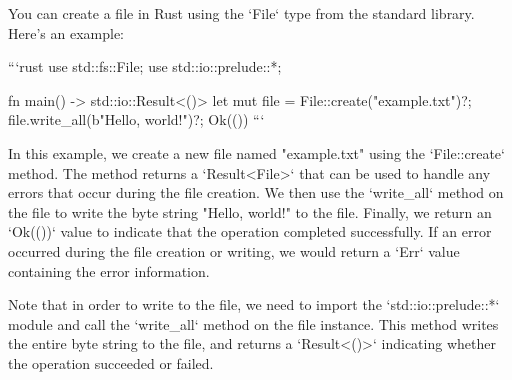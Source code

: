 You can create a file in Rust using the `File` type from the standard library. Here's an example:

```rust
use std::fs::File;
use std::io::prelude::*;

fn main() -> std::io::Result<()> {
    let mut file = File::create("example.txt")?;
    file.write_all(b"Hello, world!")?;
    Ok(())
}
```

In this example, we create a new file named "example.txt" using the `File::create` method. The method returns a `Result<File>` that can be used to handle any errors that occur during the file creation. We then use the `write_all` method on the file to write the byte string "Hello, world!" to the file. Finally, we return an `Ok(())` value to indicate that the operation completed successfully. If an error occurred during the file creation or writing, we would return a `Err` value containing the error information.

Note that in order to write to the file, we need to import the `std::io::prelude::*` module and call the `write_all` method on the file instance. This method writes the entire byte string to the file, and returns a `Result<()>` indicating whether the operation succeeded or failed.
